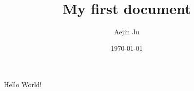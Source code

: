 \documentclass{article}
\title{My first document}
\date{\today}
\author{Aejin Ju}
\begin{document}
	\maketitle
	\newpage 
	
	
	Hello World!
	
\end{document}
